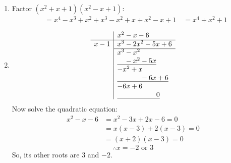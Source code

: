 \begin{multicols}{2}
\begin{enumerate}[label={\textbf{\arabic*.}}]
    \item Factor $(x^2 + x + 1)(x^2 - x + 1)$:
        \begin{align*}
        &= x^4 - x^3 + x^2 + x^3 - x^2 + x + x^2 - x + 1 \
        &= x^4 + x^2 + 1
        \end{align*}
    
    \item 
        \[
        \begin{array}{r|l}
        & x^2 - x - 6 \\
        \hline
        x - 1 & x^3 - 2x^2 - 5x + 6 \\
        \cline{2-2}
        & x^3 - x^2 \\
        & \underline{\phantom{x^3} - x^2 - 5x} \\
        & - x^2 + x \\
        & \underline{\phantom{x^3 - x^2} - 6x + 6} \\
        & - 6x + 6 \\
        & \underline{\phantom{x^3 - x^2 - 6x} 0}
        \end{array}
        \]
        Now solve the quadratic equation:
        \begin{align*}
            x^2 - x - 6 &= x^2 - 3x + 2x - 6 = 0 \\
            &= x(x - 3) + 2(x - 3) = 0 \\
            &= (x + 2)(x - 3) = 0
        \end{align*}
        \[\therefore x = -2 \text{ or } 3\]
        So, its other roots are \(3\) and \(-2\).


\end{enumerate}
\end{multicols}
